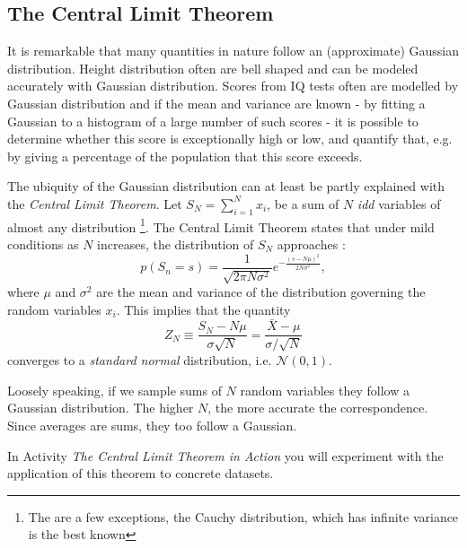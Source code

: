   \subsection{The Central Limit Theorem}    
  It is remarkable that many quantities in nature follow an (approximate) Gaussian  distribution. Height
  distribution often are bell shaped and can be modeled accurately with Gaussian distribution. Scores
  from IQ tests often are modelled by Gaussian distribution and if the mean and variance are known
  - by fitting a Gaussian to a histogram of a large number of such scores - it is possible to determine
  whether this score is exceptionally high or low, and quantify that, e.g. by giving a percentage
  of the population that this score exceeds.

  The ubiquity of the Gaussian distribution can at least be partly explained with  the
  \emph{Central Limit Theorem}. Let $S_N =  \sum^N_{i=1} x_i$, be  a sum of $N$ \emph{idd} variables of almost any distribution \footnote{The are a few exceptions, the Cauchy distribution,
    which has infinite variance is the best known}. The Central Limit Theorem
  states that under mild conditions \cite{gardiner2009} as $N$ increases, the distribution
  of $S_N$ approaches \cite{murphy2012}:
  \begin{equation}
    p(S_n = s) = \frac{1}{\sqrt{2 \pi N \sigma^2}}e^{-\frac{(s-N\mu)^2}{2N\sigma^2}},
    \label{eq-clt}
  \end{equation}
  where $\mu$ and $\sigma^2$ are the mean and variance of the distribution governing the random variables $x_i$.
  This implies that the  quantity
  $$
  Z_N \equiv \frac{S_N - N \mu}{\sigma \sqrt{N}} = \frac{\bar{X} - \mu}{\sigma/\sqrt{N}}
  $$
  converges to a \emph{standard normal} distribution, i.e. $\mathcal{N}(0,1)$.

  Loosely speaking, if we sample sums of $N$ random variables they  follow a Gaussian distribution. The
  higher $N$, the more accurate the correspondence. Since averages are sums, they too follow
  a Gaussian.

  In Activity \emph{The Central Limit Theorem in Action} you will experiment with the application of this theorem to concrete datasets.  
  

